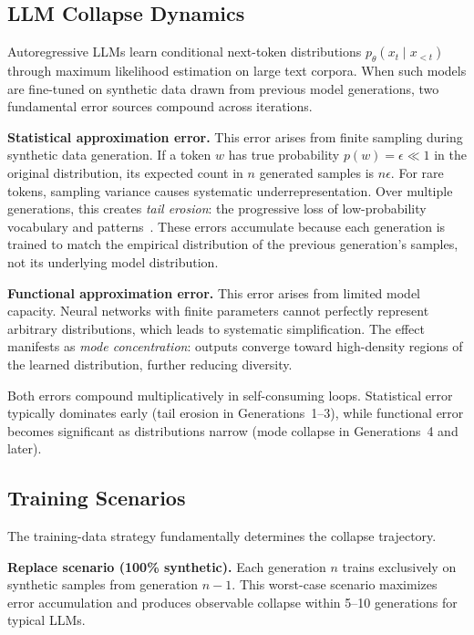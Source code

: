 \documentclass{svproc}
\begin{document}
\subsection{LLM Collapse Dynamics}
Autoregressive LLMs learn conditional next-token distributions
$p_\theta(x_t \mid x_{<t})$ through maximum likelihood estimation on large text
corpora. When such models are fine-tuned on synthetic data drawn from previous
model generations, two fundamental error sources compound across iterations.

\noindent\textbf{Statistical approximation error.} This error arises from finite
sampling during synthetic data generation. If a token $w$ has true probability
$p(w)=\epsilon \ll 1$ in the original distribution, its expected count in $n$
generated samples is $n\epsilon$. For rare tokens, sampling variance causes
systematic underrepresentation. Over multiple generations, this creates
\emph{tail erosion}: the progressive loss of low-probability vocabulary and
patterns~\cite{shumailov2024nature,dohmatob2024tale}. These errors accumulate
because each generation is trained to match the empirical distribution of the
previous generation's samples, not its underlying model distribution.

\noindent\textbf{Functional approximation error.} This error arises from limited
model capacity. Neural networks with finite parameters cannot perfectly represent
arbitrary distributions, which leads to systematic simplification. The effect
manifests as \emph{mode concentration}: outputs converge toward high-density
regions of the learned distribution, further reducing diversity.

Both errors compound multiplicatively in self-consuming loops. Statistical error
typically dominates early (tail erosion in Generations~1--3), while functional
error becomes significant as distributions narrow (mode collapse in Generations~4
and later).

\subsection{Training Scenarios}
The training-data strategy fundamentally determines the collapse trajectory.

\noindent\textbf{Replace scenario (100\% synthetic).} Each generation $n$ trains
exclusively on synthetic samples from generation $n-1$. This worst-case scenario
maximizes error accumulation and produces observable collapse within 5--10
generations for typical LLMs.
\end{document}
